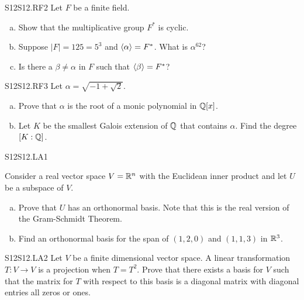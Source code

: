 \documentclass[../AlgebraQualSolutions.tex]{subfiles}
\begin{document}
	\begin{prob}{S12}{S12.RF2}
		Let $F$ be a finite field.

		\begin{enumerate}[(a)]
			\item Show that the multiplicative group $F^*$ is cyclic.
			\item Suppose $|F| = 125 = 5^3$ and $\langle \alpha \rangle = F^*$. What is $\alpha^{62}$?
			\item Is there a $\beta \neq \alpha$ in $F$ such that $\langle \beta \rangle = F^*$?
		\end{enumerate}
	\end{prob}

	\begin{prob}{S12}{S12.RF3}
		Let $\alpha = \sqrt{-1+\sqrt{2}}$.
		\begin{enumerate}[(a)]
			\item Prove that $\alpha$ is the root of a monic polynomial in $\mathbb{Q}[x]$.
			\item Let $K$ be the smallest Galois extension of $\mathbb{Q}$ that contains $\alpha$. Find the degree $[K: \mathbb{Q}]$.
		\end{enumerate}
	\end{prob}

	\begin{prob}{S12}{S12.LA1}

		Consider a real vector space $V = \mathbb{R}^n$ with the Euclidean inner product and let $U$ be a subspace of $V$.

		\begin{enumerate}[(a)]
			\item Prove that $U$ has an orthonormal basis. Note that this is the real version of the Gram-Schmidt Theorem.
			\item Find an orthonormal basis for the span of $(1,2,0)$ and $(1,1,3)$ in $\mathbb{R}^3$.
		\end{enumerate}
	\end{prob}

	\begin{prob}{S12}{S12.LA2}
		Let $V$ be a finite dimensional vector space. A linear transformation $T: V \to V$ is a projection when $T = T^2$. Prove that there exists a basis for $V$ such that the matrix for $T$ with respect to this basis is a diagonal matrix with diagonal entries all zeros or ones.
	\end{prob}
\end{document}
